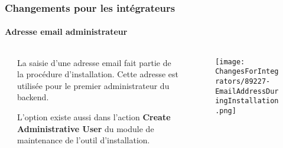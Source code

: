 \begin{frame}[fragile]
	\frametitle{Changements pour les intégrateurs}
	\framesubtitle{Adresse email administrateur}

	\begin{columns}[T]
		\begin{column}{.04\textwidth}
		\end{column}
		\begin{column}{.38\textwidth}

			La saisie d'une adresse email fait partie de la procédure d'installation.
			Cette adresse est utilisée pour le premier administrateur du backend.

			\vspace{0.2cm}

			L'option existe aussi dans l'action \textbf{Create Administrative User} du
			module de maintenance de l'outil d'installation.
			

		\end{column}
		\begin{column}{.58\textwidth}
			\vspace{-0.3cm}
			\begin{figure}
				\texttt{[image: ChangesForIntegrators/89227-EmailAddressDuringInstallation.png]}
			\end{figure}
		\end{column}
	\end{columns}

\end{frame}



